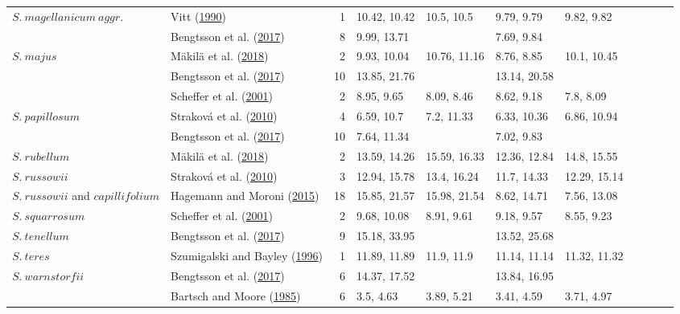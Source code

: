 \documentclass[
  12pt,
]{article}
\begin{document}
\begin{table}[H]
{\begin{tabular}[t]{llrllllllll}
\multirow[t]{-4}{*}{\raggedright\arraybackslash $S.~magellanicum~aggr.$} & Vitt (\protect\hyperlink{ref-Vitt.1990}{1990}) & 1 & 10.42, 10.42 & 10.5, 10.5 & 9.79, 9.79 & 9.82, 9.82 &  &  &  & \\
\cmidrule{1-11}
 & Bengtsson et al. (\protect\hyperlink{ref-Bengtsson.2017}{2017}) & 8 & 9.99, 13.71 &  & 7.69, 9.84 &  &  &  &  & \\

\multirow[t]{-2}{*}{\raggedright\arraybackslash $S.~majus$} & Mäkilä et al. (\protect\hyperlink{ref-Makila.2018}{2018}) & 2 & 9.93, 10.04 & 10.76, 11.16 & 8.76, 8.85 & 10.1, 10.45 &  &  &  & \\
\cmidrule{1-11}
 & Bengtsson et al. (\protect\hyperlink{ref-Bengtsson.2017}{2017}) & 10 & 13.85, 21.76 &  & 13.14, 20.58 &  &  &  &  & \\

 & Scheffer et al. (\protect\hyperlink{ref-Scheffer.2001}{2001}) & 2 & 8.95, 9.65 & 8.09, 8.46 & 8.62, 9.18 & 7.8, 8.09 &  &  &  & \\

\multirow[t]{-3}{*}{\raggedright\arraybackslash $S.~papillosum$} & Straková et al. (\protect\hyperlink{ref-Strakova.2010}{2010}) & 4 & 6.59, 10.7 & 7.2, 11.33 & 6.33, 10.36 & 6.86, 10.94 &  &  &  & \\
\cmidrule{1-11}
 & Bengtsson et al. (\protect\hyperlink{ref-Bengtsson.2017}{2017}) & 10 & 7.64, 11.34 &  & 7.02, 9.83 &  &  &  &  & \\

\multirow[t]{-2}{*}{\raggedright\arraybackslash $S.~rubellum$} & Mäkilä et al. (\protect\hyperlink{ref-Makila.2018}{2018}) & 2 & 13.59, 14.26 & 15.59, 16.33 & 12.36, 12.84 & 14.8, 15.55 &  &  &  & \\
\cmidrule{1-11}
$S.~russowii$ & Straková et al. (\protect\hyperlink{ref-Strakova.2010}{2010}) & 3 & 12.94, 15.78 & 13.4, 16.24 & 11.7, 14.33 & 12.29, 15.14 &  &  &  & \\
\cmidrule{1-11}
$S.~russowii$ and $capillifolium$ & Hagemann and Moroni (\protect\hyperlink{ref-Hagemann.2015}{2015}) & 18 & 15.85, 21.57 & 15.98, 21.54 & 8.62, 14.71 & 7.56, 13.08 &  &  &  & \\
\cmidrule{1-11}
$S.~squarrosum$ & Scheffer et al. (\protect\hyperlink{ref-Scheffer.2001}{2001}) & 2 & 9.68, 10.08 & 8.91, 9.61 & 9.18, 9.57 & 8.55, 9.23 &  &  &  & \\
\cmidrule{1-11}
$S.~tenellum$ & Bengtsson et al. (\protect\hyperlink{ref-Bengtsson.2017}{2017}) & 9 & 15.18, 33.95 &  & 13.52, 25.68 &  &  &  &  & \\
\cmidrule{1-11}
$S.~teres$ & Szumigalski and Bayley (\protect\hyperlink{ref-Szumigalski.1996}{1996}) & 1 & 11.89, 11.89 & 11.9, 11.9 & 11.14, 11.14 & 11.32, 11.32 &  &  &  & \\
\cmidrule{1-11}
$S.~warnstorfii$ & Bengtsson et al. (\protect\hyperlink{ref-Bengtsson.2017}{2017}) & 6 & 14.37, 17.52 &  & 13.84, 16.95 &  &  &  &  & \\
\cmidrule{1-11}
 & Bartsch and Moore (\protect\hyperlink{ref-Bartsch.1985}{1985}) & 6 & 3.5, 4.63 & 3.89, 5.21 & 3.41, 4.59 & 3.71, 4.97 &  &  &  & \\


\end{tabular}}
\end{table}
\end{document}
